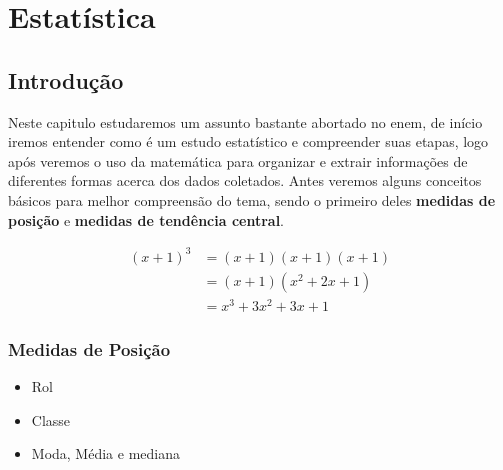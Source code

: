 \chapter{Estatística}
\section{Introdução}
Neste capitulo estudaremos um assunto bastante abortado no enem, de início iremos entender como é um estudo estatístico e compreender suas etapas, logo após veremos o uso da matemática para organizar e extrair informações de diferentes formas acerca dos dados coletados. Antes veremos alguns conceitos básicos para melhor compreensão do tema, sendo o primeiro deles \textbf{medidas de posição} e \textbf{medidas de tendência central}.

\begin{align*}
(x+1)^3 &= (x+1)(x+1)(x+1) \\
&= (x+1)(x^2 + 2x + 1) \\
&= x^3 + 3x^2 + 3x + 1
\end{align*}

\subsection{Medidas de Posição}
\begin{definition}
	
\end{definition}
	\begin{itemize}
		\item Rol
		\item Classe
		\item Moda, Média e mediana 
	\end{itemize}
